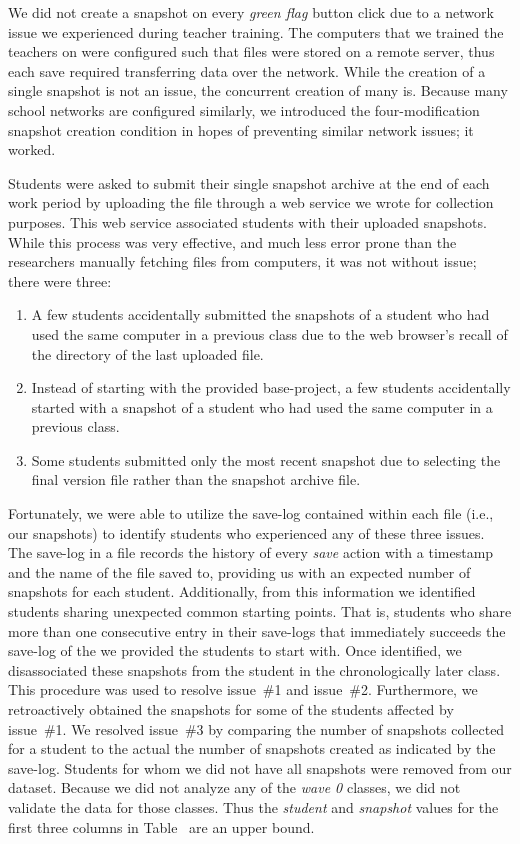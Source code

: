 We did not create a snapshot on every \emph{green flag} button click due to a
network issue we experienced during teacher training. The computers that we
trained the teachers on were configured such that \sprogram{} files were stored
on a remote server, thus each save required transferring data over the
network. While the creation of a single snapshot is not an issue, the
concurrent creation of many is. Because many school networks are configured
similarly, we introduced the four-modification snapshot creation condition in
hopes of preventing similar network issues; it worked.

Students were asked to submit their single snapshot archive at the end of each
work period by uploading the file through a web service we wrote for collection
purposes. This web service associated students with their uploaded
snapshots. While this process was very effective, and much less error prone
than the researchers manually fetching files from computers, it was not without
issue; there were three:

\begin{enumerate}
\item A few students accidentally submitted the snapshots of a student who had
  used the same computer in a previous class due to the web browser's recall of
  the directory of the last uploaded file.
\item Instead of starting with the provided base-project, a few students
  accidentally started with a snapshot of a student who had used the same
  computer in a previous class.
\item Some students submitted only the most recent snapshot due to selecting
  the final version file rather than the snapshot archive file.
\end{enumerate}

Fortunately, we were able to utilize the save-log contained within each
\sprogram{} file (i.e., our snapshots) to identify students who experienced any
of these three issues. The save-log in a \sprogram{} file records the history
of every \emph{save} action with a timestamp and the name of the file saved to,
providing us with an expected number of snapshots for each
student. Additionally, from this information we identified students sharing
unexpected common starting points. That is, students who share more than one
consecutive entry in their  save-logs that immediately succeeds
the save-log of the \sprogram{} we provided the students to start with. Once
identified, we disassociated these snapshots from the student in the
chronologically later class. This procedure was used to resolve issue~\#1 and
issue~\#2. Furthermore, we retroactively obtained the snapshots for some of the
students affected by issue~\#1. We resolved issue~\#3 by comparing the number
of snapshots collected for a student to the actual the number of snapshots
created as indicated by the save-log. Students for whom we did not have all
snapshots were removed from our dataset. Because we did not analyze any of the
\emph{wave 0} classes, we did not validate the data for those classes. Thus the
\emph{student} and \emph{snapshot} values for the first three columns in
Table~ are an upper bound.

